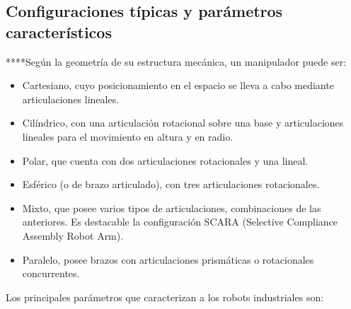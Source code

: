 \documentclass[a4paper, openright, 12pt]{report}
\begin{document}
		\subsection{Configuraciones típicas y parámetros característicos}
			****Según la geometría de su estructura mecánica, un manipulador puede ser:

			\begin{itemize}
				\item{Cartesiano, cuyo posicionamiento en el espacio se lleva a cabo mediante articulaciones lineales.}

				\item{Cilíndrico, con una articulación rotacional sobre una base y articulaciones lineales para el movimiento en altura y en radio.}

				\item{Polar, que cuenta con dos articulaciones rotacionales y una lineal.}

				\item{Esférico (o de brazo articulado), con tres articulaciones rotacionales.}

				\item{Mixto, que posee varios tipos de articulaciones, combinaciones de las anteriores. Es destacable la configuración SCARA (Selective Compliance Assembly Robot Arm).}

				\item{Paralelo, posee brazos con articulaciones prismáticas o rotacionales concurrentes.}
			\end{itemize}

Los principales parámetros que caracterizan a los robots industriales son:
\end{document}
